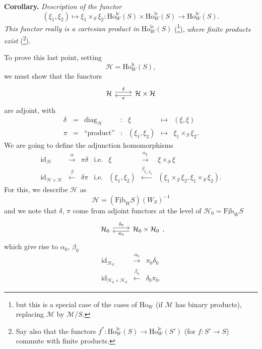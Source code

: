 \documentclass[11pt]{article}
\newcommand{\printedpage}[1]{\marginpar{\footnotesize p.~#1}}
\newcommand{\msp}[1]{\marginpar{\footnotesize [#1]}}
\newcommand{\Ho}{\mathrm{Ho}}
\newcommand{\lc}{\mathrm{lc}}
\newcommand{\uFib}{\underline{\mathrm{Fib}}}
\begin{document}
\setcounter{footnote}{131}

\printedpage{160}

\msp{page 247}

\textbf{Corollary.} {\itshape Description of the functor
\[
(\xi_1,\xi_2)\longmapsto\xi_1\times_S\xi_2 : \Ho^{\lc}_W(S)\times\Ho^{\lc}_W(S)\longrightarrow\Ho^{\lc}_W(S).
\]
This functor really is a cartesian product in} $\Ho^{\lc}_W(S)$ (\footnote{but this is a special case of the cases of $\Ho_W$ (if $\mathcal{M}$ has binary products), replacing $\mathcal{M}$ by $\mathcal{M}/S$.}), {\itshape where finite products exist} (\footnote{Say also that the functors $f^* : \Ho^{\lc}_W(S)\longrightarrow\Ho^{\lc}_W(S')$ (for $f : S'\longrightarrow S$) commute with finite products.}).

To prove this last point, setting
\[
\mathcal{H}=\Ho^{\lc}_W(S),
\]
we must show that the functors
\[
\begin{tikzcd}[ampersand replacement=\&]
\mathcal{H} \arrow[r, shift left, "\delta"] \& \mathcal{H}\times\mathcal{H} \arrow[l, shift left, "\pi"]
\end{tikzcd}
\]
are adjoint, with
\[
\begin{array}{rclcrcl}
\delta & = & \mathrm{diag}_{\mathcal{H}} & : & \xi & \longmapsto & (\xi,\xi)\\
\pi & = & \text{``product''} & : & (\xi_1,\xi_2) & \longmapsto & \xi_1\times_S\xi_2.
\end{array}
\]
We are going to define the adjunction homomorphisms
\[
\begin{array}{rcllrcl}
\mathrm{id}_{\mathcal{H}} & \xrightarrow{\alpha} & \pi\delta & \text{i.e.} & \xi & \xrightarrow{\alpha_\xi} & \xi\times_S\xi\\
\mathrm{id}_{\mathcal{H}\times\mathcal{H}} & \xleftarrow{\beta} & \delta\pi & \text{i.e.} & (\xi_1,\xi_2) & \xleftarrow{\beta_{\xi_1,\xi_2}} & (\xi_1\times_S\xi_2,\xi_1\times_S\xi_2).
\end{array}
\]
For this, we describe $\mathcal{H}$ as
\[
\mathcal{H}=(\uFib_W S)(W_S)^{-1}
\]
and we note that $\delta$, $\pi$ come from adjoint functors at the level of $\mathcal{H}_0=\uFib_W S$
\[
\begin{tikzcd}[ampersand replacement=\&]
\mathcal{H}_0 \arrow[r, shift left, "\delta_0"] \& \mathcal{H}_0\times\mathcal{H}_0 \arrow[l, shift left, "\pi_0"]
\end{tikzcd},
\]
which give rise to $\alpha_0$, $\beta_0$
\[
\begin{array}{rcl}
\mathrm{id}_{\mathcal{H}_0} & \xrightarrow{\alpha_0} & \pi_0\delta_0\\
\mathrm{id}_{\mathcal{H}_0\times\mathcal{H}_0} & \xleftarrow{\beta_0} & \delta_0\pi_0.
\end{array}
\]
\end{document}
